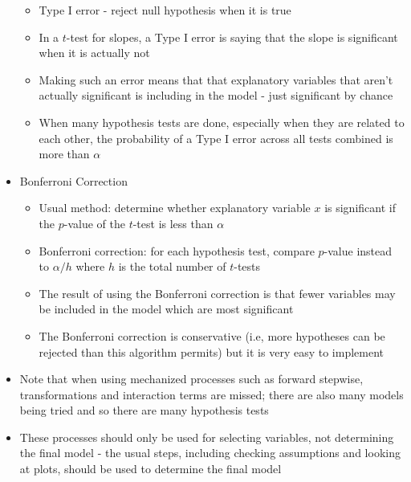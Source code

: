 \documentclass[12pt]{article}
\begin{document}
\begin{itemize}
\begin{itemize}
\item Type I error - reject null hypothesis when it is true 
\item In a $t$-test for slopes, a Type I error is saying that the slope is significant when it is actually not 
\item Making such an error means that that explanatory variables that aren't actually significant is including in the model - just significant by chance 
\item When many hypothesis tests are done, especially when they are related to each other, the probability of a Type I error across all tests combined is more than $\alpha$ \end{itemize} 
\item Bonferroni Correction \begin{itemize} 
\item Usual method: determine whether explanatory variable $x$ is significant if the $p$-value of the $t$-test is less than $\alpha$ 
\item Bonferroni correction: for each hypothesis test, compare $p$-value instead to $\alpha / h $ where $h$ is the total number of $t$-tests 
\item The result of using the Bonferroni correction is that fewer variables may be included in the model which are most significant 
\item The Bonferroni correction is conservative (i.e, more hypotheses can be rejected than this algorithm permits) but it is very easy to implement \end{itemize} 
\item Note that when using mechanized processes such as forward stepwise, transformations and interaction terms are missed; there are also many models being tried and so there are many hypothesis tests 
\item These processes should only be used for selecting variables, not determining the final model - the usual steps, including checking assumptions and looking at plots, should be used to determine the final model
\end{itemize}
\end{document}
